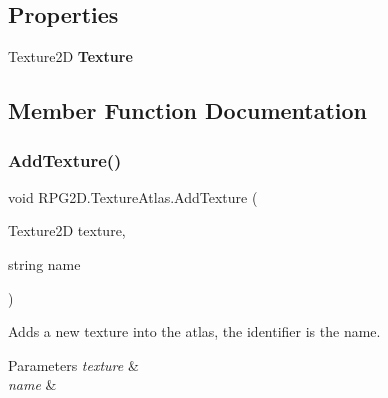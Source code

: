 \subsection*{Properties}
\begin{DoxyCompactItemize}
\item 
\mbox{\label{class_r_p_g2_d_1_1_texture_atlas_a93e90a6ef0629667c4e726203d7100d5}} 
Texture2D {\bfseries Texture}
\end{DoxyCompactItemize}


\subsection{Member Function Documentation}
\mbox{\label{class_r_p_g2_d_1_1_texture_atlas_a6ae525140aaa805c849a86ef345cedfe}} 
\subsubsection{\texorpdfstring{Add\+Texture()}{AddTexture()}\hspace{0.1cm}{\footnotesize\ttfamily [1/2]}}
{\footnotesize\ttfamily void R\+P\+G2\+D.\+Texture\+Atlas.\+Add\+Texture (\begin{DoxyParamCaption}\item[{Texture2D}]{texture,  }\item[{string}]{name }\end{DoxyParamCaption})\hspace{0.3cm}{\ttfamily [inline]}}



Adds a new texture into the atlas, the identifier is the name. 


\begin{DoxyParams}{Parameters}
{\em texture} & \\
\hline
{\em name} & \\
\hline
\end{DoxyParams}
\mbox{\label{class_r_p_g2_d_1_1_texture_atlas_a4cec194e23e586d0604379d5bb38fe72}} 
